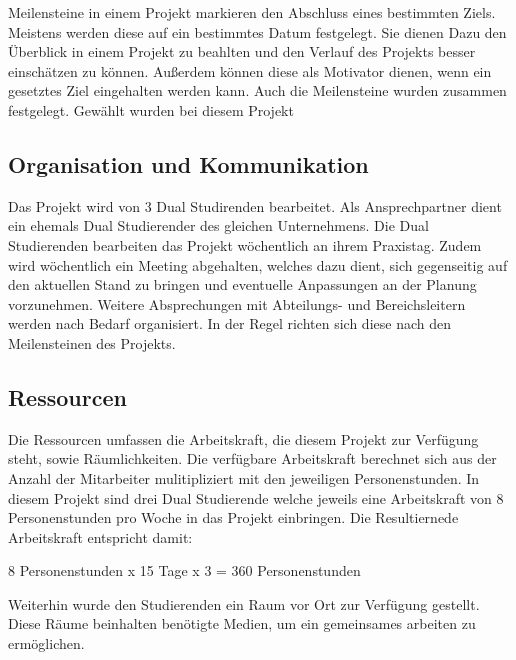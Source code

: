\documentclass[ThesisDJ.tex]{subfiles}
\begin{document}
Meilensteine in einem Projekt markieren den Abschluss eines bestimmten Ziels. Meistens werden diese auf ein bestimmtes Datum festgelegt. Sie dienen Dazu den Überblick in einem Projekt zu beahlten und den Verlauf des Projekts besser einschätzen zu können. Außerdem können diese als Motivator dienen, wenn ein gesetztes Ziel eingehalten werden kann. 
Auch die Meilensteine wurden zusammen festgelegt. Gewählt wurden bei diesem Projekt  


\subsection{Organisation und Kommunikation}
Das Projekt wird von 3 Dual Studirenden bearbeitet. Als Ansprechpartner dient ein ehemals Dual Studierender des gleichen Unternehmens. Die Dual Studierenden bearbeiten das Projekt wöchentlich an ihrem Praxistag. Zudem wird wöchentlich ein Meeting abgehalten, welches dazu dient, sich gegenseitig auf den aktuellen Stand zu bringen und eventuelle Anpassungen an der Planung vorzunehmen. Weitere Absprechungen mit Abteilungs- und Bereichsleitern werden nach Bedarf organisiert. In der Regel richten sich diese nach den Meilensteinen des Projekts.  

\subsection{Ressourcen}

Die Ressourcen umfassen die Arbeitskraft, die diesem Projekt zur Verfügung steht, sowie Räumlichkeiten. 
Die verfügbare Arbeitskraft berechnet sich aus der Anzahl der Mitarbeiter mulitipliziert mit den jeweiligen Personenstunden.
In diesem Projekt sind drei Dual Studierende welche jeweils eine Arbeitskraft von 8 Personenstunden pro Woche in das Projekt einbringen. 
Die Resultiernede Arbeitskraft entspricht damit:

		8 Personenstunden x 15 Tage x 3 = 360 Personenstunden

Weiterhin wurde den Studierenden ein Raum vor Ort zur Verfügung gestellt. Diese Räume beinhalten benötigte Medien, um ein gemeinsames arbeiten zu ermöglichen.
\end{document}
